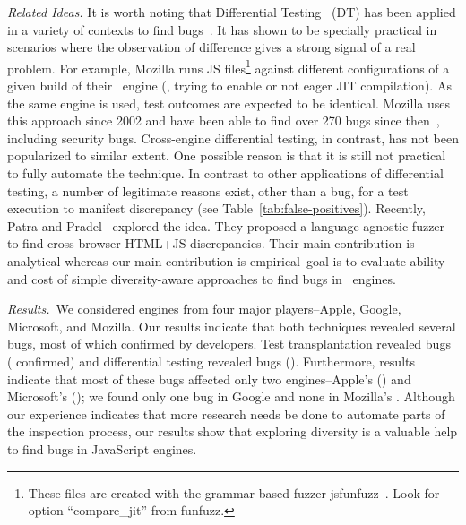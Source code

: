 \documentclass[10pt,conference,anonymous]{IEEEtran}
\begin{document}
\emph{Related Ideas.}  It is worth noting that Differential
Testing~\cite{Brumley-etal-ss07} (DT) has been applied in a variety of
contexts to find
bugs~\cite{Yang-etal-pldi11,Chen-etal-fse2015,Argyros-etla-ccs16,Chen-etal-pldi16,petsios-etal-sp2017,SivakornAPKJ17,Zhang:2017:ATD:3097368.3097448}.
It has shown to be specially practical in scenarios where the
observation of difference gives a strong signal of a real problem. For
example, Mozilla runs JS files\footnote{These files are created with
  the grammar-based fuzzer jsfunfuzz~\cite{jsfunfuzz}. Look for option
  ``compare\_jit'' from funfuzz.} against different configurations of
a given build of their \smonkey\ engine (\eg{}, trying to enable or
not eager JIT compilation). As the same engine is used, test outcomes are
expected to be identical. Mozilla uses this approach since 2002 and
have been able to find over 270 bugs since
then~\cite{jsfunfuzz-at-mozilla}, including security
bugs. Cross-engine differential testing, in contrast, has not been
popularized to similar extent. One possible reason is that it is still
not practical to fully automate the technique. In contrast to other
applications of differential testing, a number of legitimate reasons
exist, other than a bug, for a test execution to manifest discrepancy
(see Table~\ref{tab:false-positives}). Recently, Patra and
Pradel~\cite{patra2016learning} explored the idea. They proposed a
language-agnostic fuzzer to find cross-browser HTML+JS
discrepancies. Their main contribution is analytical whereas our main
contribution is empirical--goal is to evaluate ability and cost of
simple diversity-aware approaches to find bugs in \js\ engines.

\emph{Results.}~We considered engines from four major players--Apple,
Google, Microsoft, and Mozilla. Our results indicate that both
techniques revealed several bugs, most of which confirmed by
developers. Test transplantation revealed \noBugsTransplantation{}
bugs (\noBugsTransplantationConfirmed{} confirmed) and differential
testing revealed \noBugsDifferentialTesting{} bugs
(\noBugsDifferentialTestingConfirmed{}). Furthermore, results indicate
that most of these bugs affected only two engines--Apple's \jsc{}
(\percJSC{}) and Microsoft's \chakra{} (\percChakra{}); we found only
one bug in Google \veight{} and none in Mozilla's \smonkey{}. Although
our experience indicates that more research needs be done to automate
parts of the inspection process, our results show that exploring
diversity is a valuable help to find bugs in JavaScript engines.
\end{document}
